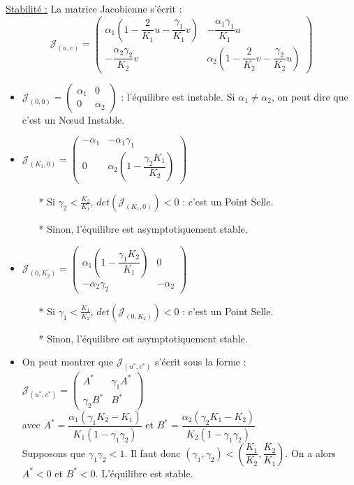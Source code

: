 \documentclass[a4paper,11pt]{article}
\begin{document}
\noindent \underline{Stabilité :}
La matrice Jacobienne s'écrit : $$\mathcal{J}_{(u,v)}=\begin{pmatrix} \alpha_1\left(1-\dfrac{2}{K_1}u-\dfrac{\gamma_1}{K_1}v\right) & -\dfrac{\alpha_1\gamma_1}{K_1}u \\ -\dfrac{\alpha_2\gamma_2}{K_2}v & \alpha_2\left(1- \dfrac{2}{K_2}v-\dfrac{\gamma_2}{K_2}u\right)\end{pmatrix}$$
\begin{itemize}[label=$\bullet$]
\item $\mathcal{J}_{(0,0)} = \begin{pmatrix} \alpha_1 & 0 \\ 0 & \alpha_2 
\end{pmatrix}$
 : l'équilibre est instable. Si $\alpha_1 \neq \alpha_2$, on peut dire que c'est un Nœud Instable.
 
 \item $\mathcal{J}_{(K_1,0)} = \begin{pmatrix} -\alpha_1 & -\alpha_1\gamma_1 \\ 0 & \alpha_2\left(1- \dfrac{\gamma_2 K_1}{K_2}\right)
\end{pmatrix} $\\
\begin{itemize}
  \item[*] Si $\gamma_2 < \frac{K_2}{K_1}$, $det(\mathcal{J}_{(K_1,0)}) < 0$ : c'est un Point Selle.
  \item[*] Sinon, l'équilibre est asymptotiquement stable.\\
  \end{itemize}
  
\item $\mathcal{J}_{(0,K_2)} = \begin{pmatrix} \alpha_1\left(1-\dfrac{\gamma_1 K_2}{K_1}\right) & 0 \\ -\alpha_2\gamma_2 & -\alpha_2 \end{pmatrix}$\\
  \begin{itemize}
  \item[*] Si $\gamma_1 < \frac{K_1}{K_2}$, $det(\mathcal{J}_{(0,K_2)}) < 0$ : c'est un Point Selle.
  \item[*] Sinon, l'équilibre est asymptotiquement stable.
  \end{itemize} 
  
\item On peut montrer que $\mathcal{J}_{(u^*,v^*)}$ s'écrit sous la forme : $\mathcal{J}_{(u^*,v^*)} = \begin{pmatrix}
A^* & \gamma_1A^* \\ \gamma_2B^* & B^*
\end{pmatrix}$ \\
avec $A^* = \dfrac{\alpha_1(\gamma_1K_2-K_1)}{K_1(1-\gamma_1\gamma_2)}$ et $B^* = \dfrac{\alpha_2(\gamma_2K_1-K_2)}{K_2(1-\gamma_1\gamma_2)}$\\

Supposons que $\gamma_1\gamma_2 < 1$. Il faut donc $(\gamma_1,\gamma_2) < \left(\dfrac{K_1}{K_2},\dfrac{K_2}{K_1}\right)$.
On a alors $A^* < 0$ et $B^* < 0$. L'équilibre est stable.\\

\end{itemize}
\end{document}
